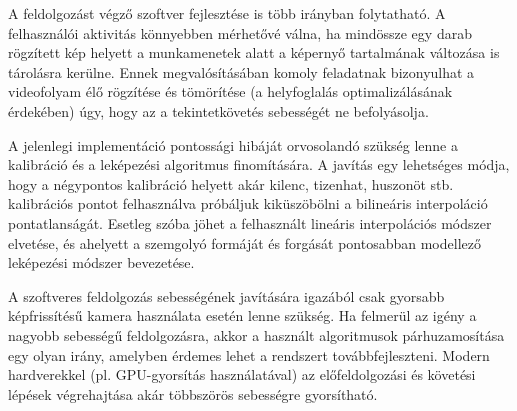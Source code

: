\bigskip

A feldolgozást végző szoftver fejlesztése is több irányban folytatható. A felhasználói aktivitás könnyebben mérhetővé válna, ha mindössze egy darab rögzített kép helyett a munkamenetek alatt a képernyő tartalmának változása is tárolásra kerülne. Ennek megvalósításában komoly feladatnak bizonyulhat a videofolyam élő rögzítése és tömörítése (a helyfoglalás optimalizálásának érdekében) úgy, hogy az a tekintetkövetés sebességét ne befolyásolja.

A jelenlegi implementáció pontossági hibáját orvosolandó szükség lenne a kalibráció és a leképezési algoritmus finomítására. A javítás egy lehetséges módja, hogy a négypontos kalibráció helyett akár kilenc, tizenhat, huszonöt stb. kalibrációs pontot felhasználva próbáljuk kiküszöbölni a bilineáris interpoláció pontatlanságát. Esetleg szóba jöhet a felhasznált lineáris interpolációs módszer elvetése, és ahelyett a szemgolyó formáját és forgását pontosabban modellező leképezési módszer bevezetése.

A szoftveres feldolgozás sebességének javítására igazából csak gyorsabb képfrissítésű kamera használata esetén lenne szükség. Ha felmerül az igény a nagyobb sebességű feldolgozásra, akkor a használt algoritmusok párhuzamosítása egy olyan irány, amelyben érdemes lehet a rendszert továbbfejleszteni. Modern hardverekkel (pl. GPU-gyorsítás használatával) az előfeldolgozási és követési lépések végrehajtása akár többszörös sebességre gyorsítható.